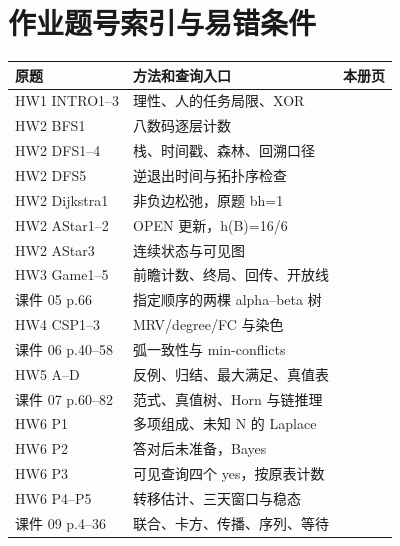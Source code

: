 \section{作业题号索引与易错条件}\label{sec:crossref}
\begin{longtable}{p{}p{}r}
\toprule 原题 & 方法和查询入口 & 本册页\\\midrule\endhead
HW1 INTRO1--3 & 理性、人的任务局限、XOR & \pageref{sec:intro}\\
HW2 BFS1 & 八数码逐层计数 & \pageref{sec:search}\\
HW2 DFS1--4 & 栈、时间戳、森林、回溯口径 & \pageref{sec:search}\\
HW2 DFS5 & 逆退出时间与拓扑序检查 & \pageref{ex:topo}\\
HW2 Dijkstra1 & 非负边松弛，原题 bh=1 & \pageref{ex:dijkstra}\\
HW2 AStar1--2 & OPEN 更新，h(B)=16/6 & \pageref{sec:astar}\\
HW2 AStar3 & 连续状态与可见图 & \pageref{sec:astar}\\
HW3 Game1--5 & 前瞻计数、终局、回传、开放线 & \pageref{sec:games}\\
课件 05 p.66 & 指定顺序的两棵 alpha--beta 树 & \pageref{ex:ab}\\
HW4 CSP1--3 & MRV/degree/FC 与染色 & \pageref{sec:csp}\\
课件 06 p.40--58 & 弧一致性与 min-conflicts & \pageref{ex:ac}\\
HW5 A--D & 反例、归结、最大满足、真值表 & \pageref{sec:logic}\\
课件 07 p.60--82 & 范式、真值树、Horn 与链推理 & \pageref{sec:logic}\\
HW6 P1 & 多项组成、未知 N 的 Laplace & \pageref{sec:prob}\\
HW6 P2 & 答对后未准备，Bayes & \pageref{sec:bayes}\\
HW6 P3 & 可见查询四个 yes，按原表计数 & \pageref{sec:bayes}\\
HW6 P4--P5 & 转移估计、三天窗口与稳态 & \pageref{ex:transition}\\
课件 09 p.4--36 & 联合、卡方、传播、序列、等待 & \pageref{sec:markov}\\\bottomrule
\end{longtable}
